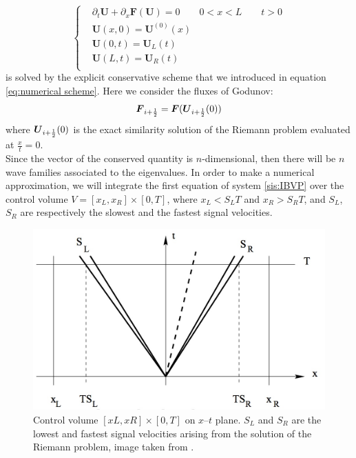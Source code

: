 \documentclass[12pt,a4paper]{article}
\numberwithin{equation}{section}
\begin{document}
\begin{equation}\label{sis:IBVP}
	\left\{
      \begin{aligned}
       & \partial_t \boldsymbol{U} + \partial_x \boldsymbol{F}(\boldsymbol{U}) = 0 \qquad 0<x<L \qquad t > 0\\
       & \boldsymbol{U}(x,0) = \boldsymbol{U}^{(0)}(x)\\
       & \boldsymbol{U}(0,t) = \boldsymbol{U}_L(t)\\
       & \boldsymbol{U}(L,t) = \boldsymbol{U}_R(t)\\
      \end{aligned}
    \right.
\end{equation}
is solved by the explicit conservative scheme that we introduced in equation \ref{eq:numerical scheme}. Here we consider the fluxes of Godunov:
\begin{equation}
\boldsymbol{F}_{i+ {1 \over 2}} = \boldsymbol{F}( \boldsymbol{U}_{i+ {1 \over 2}}(0))
\end{equation}
where $\boldsymbol{U}_{i+ {1 \over 2}}(0)$ is the exact similarity solution of the Riemann problem evaluated at $\frac{x}{t} = 0$.\\
Since the vector of the conserved quantity is $n$-dimensional, then there will be $n$ wave families associated to the eigenvalues. In order to make a numerical approximation, we will integrate the first equation of system \ref{sis:IBVP} over the control volume $V = [x_L, x_R] \times [0, T]$, where $x_L < S_L T$ and $x_R > S_R T$, and $S_L$, $S_R$ are respectively the slowest and the fastest signal velocities.\\
\begin{figure}[H]
  \centering
    \includegraphics[width=12cm]{ibvp.jpeg}
    \caption{Control volume $[xL, xR] \times [0,T]$ on $x–t$ plane. $S_L$ and $S_R$ are the lowest and fastest signal velocities arising from the solution of the Riemann problem, image taken from \cite{HLLC}.}
    \label{fig:ibvp}
\end{figure}
\end{document}
